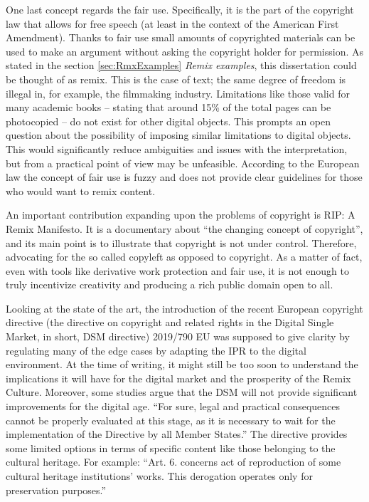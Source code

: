 One last concept regards the fair use. Specifically, it is the part of the copyright law that allows for free speech (at least in the context of the American First Amendment). Thanks to fair use small amounts of copyrighted materials can be used to make an argument without asking the copyright holder for permission. As stated in the section \ref{sec:RmxExamples} \emph{Remix examples}, this dissertation could be thought of as remix. This is the case of text; the same degree of freedom is illegal in, for example, the filmmaking industry. Limitations like those valid for many academic books – stating that around 15\% of the total pages can be photocopied – do not exist for other digital objects. This prompts an open question about the possibility of imposing similar limitations to digital objects. This would significantly reduce ambiguities and issues with the interpretation, but from a practical point of view may be unfeasible. According to the European law the concept of fair use is fuzzy and does not provide clear guidelines for those who would want to remix content.

An important contribution expanding upon the problems of copyright is RIP: A Remix Manifesto. It is a documentary about “the changing concept of copyright”, and its main point is to illustrate that copyright is not under control. Therefore, advocating for the so called copyleft as opposed to copyright. As a matter of fact, even with tools like derivative work protection and fair use, it is not enough to truly incentivize creativity and producing a rich public domain open to all.

Looking at the state of the art, the introduction of the recent European copyright directive (the directive on copyright and related rights in the Digital Single Market, in short, DSM directive) 2019/790 EU was supposed to give clarity by regulating many of the edge cases by adapting the IPR to the digital environment.
At the time of writing, it might still be too soon to understand the implications it will have for the digital market and the prosperity of the Remix Culture. Moreover, some studies argue that the DSM will not provide significant improvements for the digital age. “For sure, legal and practical consequences cannot be properly evaluated at this stage, as it is necessary to wait for the implementation of the Directive by all Member States.” The directive provides some limited options in terms of specific content like those belonging to the cultural heritage. For example: “Art. 6. concerns act of reproduction of some cultural heritage institutions’ works. This derogation operates only for preservation purposes.”

